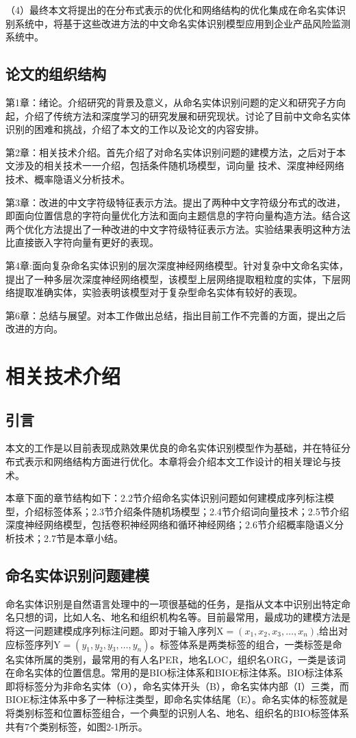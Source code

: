 \documentclass[winfonts,master,oneside,nobackinfo]{njuthesis}
\begin{document}
（4）最终本文将提出的在分布式表示的优化和网络结构的优化集成在命名实体识别系统中，将基于这些改进方法的中文命名实体识别模型应用到企业产品风险监测系统中。

\section{论文的组织结构}
第1章：绪论。介绍研究的背景及意义，从命名实体识别问题的定义和研究子方向起，介绍了传统方法和深度学习的研究发展和研究现状。讨论了目前中文命名实体识别的困难和挑战，介绍了本文的工作以及论文的内容安排。

第2章：相关技术介绍。首先介绍了对命名实体识别问题的建模方法，之后对于本文涉及的相关技术一一介绍，包括条件随机场模型，词向量
技术、深度神经网络技术、概率隐语义分析技术。

第3章：改进的中文字符级特征表示方法。提出了两种中文字符级分布式的改进，即面向位置信息的字符向量优化方法和面向主题信息的字符向量构造方法。结合这两个优化方法提出了一种改进的中文字符级特征表示方法。实验结果表明这种方法比直接嵌入字符向量有更好的表现。

第4章:面向复杂命名实体识别的层次深度神经网络模型。针对复杂中文命名实体，提出了一种多层次深度神经网络模型，该模型上层网络提取粗粒度的实体，下层网络提取准确实体，实验表明该模型对于复杂型命名实体有较好的表现。


第6章：总结与展望。对本工作做出总结，指出目前工作不完善的方面，提出之后改进的方向。

\chapter{相关技术介绍}

\section{引言}
本文的工作是以目前表现成熟效果优良的命名实体识别模型作为基础，并在特征分布式表示和网络结构方面进行优化。本章将会介绍本文工作设计的相关理论与技术。

本章下面的章节结构如下：2.2节介绍命名实体识别问题如何建模成序列标注模型，介绍标签体系；2.3节介绍条件随机场模型；2.4节介绍词向量技术；2.5节介绍深度神经网络模型，包括卷积神经网络和循环神经网络；2.6节介绍概率隐语义分析技术；2.7节是本章小结。

\section{命名实体识别问题建模}
命名实体识别是自然语言处理中的一项很基础的任务，是指从文本中识别出特定命名只想的词，比如人名、地名和组织机构名等。目前最常用，最成功的建模方法是将这一问题建模成序列标注问题。即对于输入序列$\mathrm { X } = \left( x _ { 1 } , x _ { 2 } , x _ { 3 } , \dots , x _ { n } \right)$,给出对应标签序列$\mathrm { Y } = \left( y _ { 1 } , y _ { 2 } , y _ { 3 } , \dots , y _ { n } \right)$。标签体系是两类标签的组合，一类标签是命名实体所属的类别，最常用的有人名PER，地名LOC，组织名ORG，一类是该词在命名实体的位置信息。常用的是BIO标注体系和BIOE标注体系。BIO标注体系即将标签分为非命名实体（O），命名实体开头（B），命名实体内部（I）三类，而BIOE标注体系中多了一种标注类型，即命名实体结尾（E）。命名实体的标签就是将类别标签和位置标签组合，一个典型的识别人名、地名、组织名的BIO标签体系共有7个类别标签，如图2-1所示。
\end{document}
